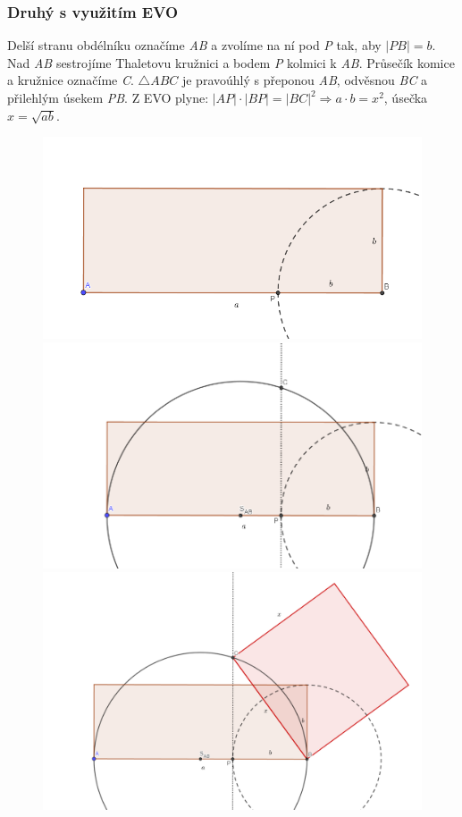 \documentclass[12pt, a4paper]{article}
\newcommand{\imply}{\Rightarrow}
\begin{document}
\subsubsection*{Druhý s využitím EVO}
Delší stranu obdélníku označíme \textit{AB} a zvolíme na ní pod \textit{P} tak, aby $|PB| = b$. Nad \textit{AB} sestrojíme Thaletovu kružnici a bodem \textit{P} kolmici k \textit{AB}.
Průsečík komice a kružnice označíme \textit{C}. $\triangle ABC$ je pravoúhlý s přeponou \textit{AB}, odvěsnou \textit{BC} a přilehlým úsekem \textit{PB}. 
Z EVO plyne: $|AP|\cdot |BP|= |BC|^2 \imply a \cdot b = x^2$, úsečka $x=\sqrt{ab}$. 

\begin{figure}[H]
\centering
\includegraphics[scale=0.35]{ponc4}
\includegraphics[scale=0.35]{ponc5}
\includegraphics[scale=0.35]{ponc6}
\end{figure} 
\end{document}

